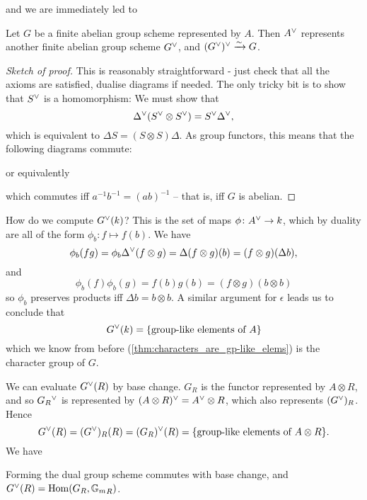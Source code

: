 \documentclass{memoir}
\begin{document}
and we are immediately led to
\begin{theorem}\label{thm:Cartier_duality}
	Let $ G $ be a finite abelian group scheme represented by $ A $. Then $ A{}^\vee $ represents another finite abelian group scheme $ G{}^\vee $, and $ (G{}^\vee){}^\vee \xrightarrow{\sim} G $.
\end{theorem}
\begin{proof}[Sketch of proof]
	This is reasonably straightforward - just check that all the axioms are satisfied, dualise diagrams if needed.
	The only tricky bit is to show that $ S{}^\vee $ is a homomorphism: We must show that \[ \Delta{}^\vee(S{}^\vee\otimes S{}^\vee) =S{}^\vee\Delta{}^\vee, \] which is equivalent to $ \Delta S = (S\otimes S)\Delta $.
	As group functors, this means that the following diagrams commute:

	 \quad or equivalently  which commutes iff $ a^{-1}b^{-1}=(ab)^{-1} $ -- that is, iff $ G $ is abelian.\end{proof}

How do we compute $ G{}^\vee(k) $?
This is the set of maps $\phi\colon A{}^\vee\to k $, which by duality are all of the form $ \phi_b\colon f\mapsto f(b) $. We have 
\[ \phi_b(fg)=\phi_b\Delta{}^\vee(f\otimes g)=\Delta(f\otimes g)(b)=(f\otimes g)(\Delta b) ,\] and
\[ \phi_b(f)\phi_b(g)=f(b)g(b)=(f\otimes g)(b\otimes b) \]
so $ \phi_b $ preserves products iff $ \Delta b=b\otimes b $. A similar argument for $ \epsilon $ leads us to conclude that
\[ G{}^\vee(k)= \{\textrm{group-like elements of } A\} \]
which we know from before (\cref{thm:characters_are_gp-like_elems}) is the character group of $ G $.

We can evaluate $ G{}^\vee(R) $ by base change. $ G_R $ is the functor represented by $ A\otimes R $, and so $ G_R{}^\vee  $ is represented by $ (A\otimes R){}^\vee = A{}^\vee\otimes R $, which also represents $ (G{}^\vee)_R $.
Hence \[ G{}^\vee(R)=(G{}^\vee)_R(R)=(G_R){}^\vee(R)= \{\textrm{group-like elements of } A\otimes R\}.\]
We have
\begin{corollary}\label{cor:cartier_duality_2}
	Forming the dual group scheme commutes with base change, and $ G{}^\vee(R)=\operatorname{Hom}(G_R, {\mathbb{G}_m}_R) $.
\end{corollary}
\end{document}
